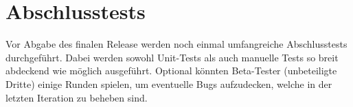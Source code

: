 \documentclass[11pt,a4paper]{scrreprt}
\begin{document}
\section{Abschlusstests}
Vor Abgabe des finalen Release werden noch einmal umfangreiche Abschlusstests durchgeführt. Dabei werden sowohl Unit-Tests als auch manuelle Tests so breit abdeckend wie möglich ausgeführt. Optional könnten Beta-Tester (unbeteiligte Dritte) einige Runden spielen, um eventuelle Bugs aufzudecken, welche in der letzten Iteration zu beheben sind.
\end{document}
